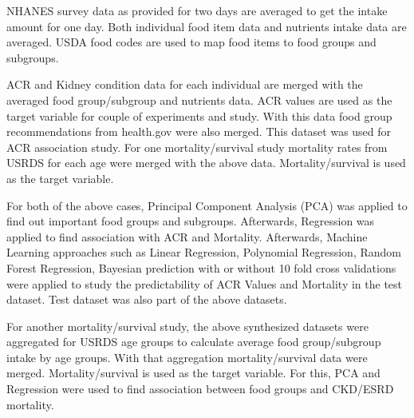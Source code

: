 \noindent NHANES survey data as provided for two days are averaged to get the intake amount for one day. Both individual food item data and nutrients intake data are averaged. USDA food codes are used to map food items to food groups and subgroups.

\medskip 
\noindent ACR and Kidney condition data for each individual are merged with the averaged food group/subgroup and nutrients data. ACR values are used as the target variable for couple of experiments and study. With this data food group recommendations from health.gov were also merged. This dataset was used for ACR association study. For one mortality/survival study mortality rates from USRDS for each age were merged with the above data. Mortality/survival is used as the target variable.

\medskip 
\noindent For both of the above cases, Principal Component Analysis (PCA) was applied to find out important food groups and subgroups. Afterwards, Regression was applied to find association with ACR and Mortality. Afterwards, Machine Learning approaches such as Linear Regression, Polynomial Regression, Random Forest Regression, Bayesian prediction with or without 10 fold cross validations were applied to study the predictability of ACR Values and Mortality in the test dataset. Test dataset was also part of the above datasets.

\medskip
\noindent For another mortality/survival study, the above synthesized datasets were aggregated for USRDS age groups to calculate average food group/subgroup intake by age groups. With that aggregation mortality/survival data were merged. Mortality/survival is used as the target variable. For this, PCA and Regression were used to find association between food groups and CKD/ESRD mortality.